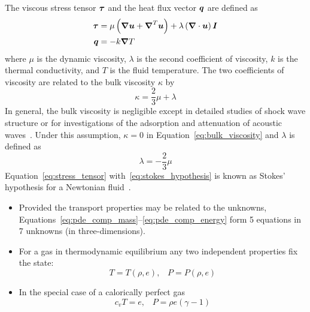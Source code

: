 \documentclass[compress,11pt]{beamer}
\begin{document}
\frame
{
  \small
  The viscous stress tensor ${\boldsymbol{\tau}}$ and the heat flux vector ${\boldsymbol{q}}$ are defined as
  \begin{align}
    \label{eq:stress_tensor}
    {\boldsymbol{\tau}} &= \mu\left({\boldsymbol{\nabla}} {{\boldsymbol{u}}} + {\boldsymbol{\nabla}}^T {{\boldsymbol{u}}}\right) + \lambda \left({\boldsymbol{\nabla}} {}\cdot{\boldsymbol{u}}\right){\boldsymbol{I}} \\
    \label{eq:fouriers_law}
    {\boldsymbol{q}} &= -k{\boldsymbol{\nabla}} {T}
  \end{align}
  where $\mu$ is the dynamic viscosity, $\lambda$ is the second coefficient of viscosity, $k$ is the thermal conductivity, and $T$ is the fluid temperature.  The two coefficients of viscosity are related to the bulk viscosity $\kappa$ by
  \begin{equation}
    \label{eq:bulk_viscosity}
    \kappa = \frac{2}{3} \mu + \lambda
  \end{equation}
  In general, the bulk viscosity is negligible except in detailed studies of shock wave structure or for investigations of the adsorption and attenuation of acoustic waves~\cite{cfmht}. Under this assumption, $\kappa=0$ in Equation~\eqref{eq:bulk_viscosity} and $\lambda$ is defined as
  \begin{equation}
    \label{eq:stokes_hypothesis}
    \lambda = -\frac{2}{3} \mu
  \end{equation}
  Equation~\eqref{eq:stress_tensor} with~\eqref{eq:stokes_hypothesis} is known as Stokes' hypothesis for a Newtonian fluid~\cite{panton_incompressible_flow}.
  \normalsize
}


\frame
{
  \begin{itemize}
    \item Provided the transport properties may be related to the unknowns, Equations~\eqref{eq:pde_comp_mass}--\eqref{eq:pde_comp_energy} form 5 equations in 7 unknowns (in three-dimensions).
    \item For a gas in thermodynamic equilibrium any two independent properties fix the state:
      \begin{equation*}
	T = T\left(\rho,e\right),\;\;\; P = P\left(\rho,e\right)
      \end{equation*}
    \item In the special case of a calorically perfect gas
      \begin{equation*}
	c_v T = e,\;\;\; P = \rho e\left(\gamma-1\right)
      \end{equation*}
  \end{itemize}
}
\end{document}
